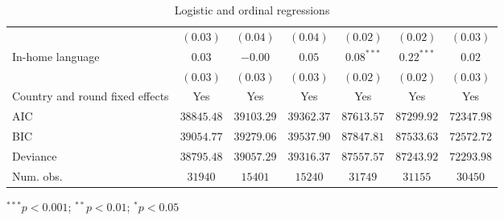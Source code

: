 \begin{table}
\begin{center}
\begin{threeparttable}
\begin{tabular}{l c c c c c c}
                                & $(0.03)$      & $(0.04)$      & $(0.04)$      & $(0.02)$      & $(0.02)$      & $(0.03)$      \\
In-home language                & $0.03$        & $-0.00$       & $0.05$        & $0.08^{***}$  & $0.22^{***}$  & $0.02$        \\
                                & $(0.03)$      & $(0.03)$      & $(0.03)$      & $(0.02)$      & $(0.02)$      & $(0.03)$      \\
\midrule
Country and round fixed effects & Yes           & Yes           & Yes           & Yes           & Yes           & Yes           \\
AIC                             & $38845.48$    & $39103.29$    & $39362.37$    & $87613.57$    & $87299.92$    & $72347.98$    \\
BIC                             & $39054.77$    & $39279.06$    & $39537.90$    & $87847.81$    & $87533.63$    & $72572.72$    \\
Deviance                        & $38795.48$    & $39057.29$    & $39316.37$    & $87557.57$    & $87243.92$    & $72293.98$    \\
Num. obs.                       & $31940$       & $15401$       & $15240$       & $31749$       & $31155$       & $30450$       \\
\bottomrule
\end{tabular}
\begin{tablenotes}[flushleft]
\scriptsize{\item $^{***}p<0.001$; $^{**}p<0.01$; $^{*}p<0.05$}
\end{tablenotes}
\end{threeparttable}
\caption{Logistic and ordinal regressions}
\label{table:coefficients}
\end{center}
\end{table}
